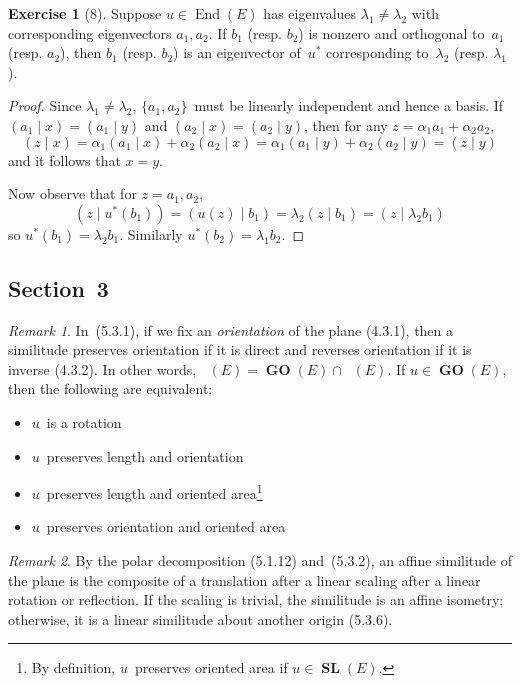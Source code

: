 \documentclass[letterpaper,12pt]{article}
\newcommand{\sect}{\cap}
\DeclareMathOperator{\End}{End}
\DeclareMathOperator{\GL}{\mathbf{GL}}
\DeclareMathOperator{\GLp}{\GL^+}
\DeclareMathOperator{\SL}{\mathbf{SL}}
\DeclareMathOperator{\GO}{\mathbf{GO}}
\DeclareMathOperator{\GOp}{\GO^+}
\newcommand{\innerprod}[2]{({#1}\;|\;{#2})}
\newcommand{\adj}[1]{#1^*}
\theoremstyle{definition}
\newtheorem*{exer}{Exercise}
\theoremstyle{remark}
\newtheorem*{rmk}{Remark}
\begin{document}
\begin{exer}[8]
Suppose \(u\in\End(E)\) has eigenvalues \(\lambda_1\ne\lambda_2\) with corresponding eigenvectors \(a_1,a_2\). If \(b_1\) (resp. \(b_2\)) is nonzero and orthogonal to~\(a_1\) (resp. \(a_2\)), then \(b_1\) (resp. \(b_2\)) is an eigenvector of~\(\adj{u}\) corresponding to~\(\lambda_2\) (resp. \(\lambda_1\)).
\end{exer}
\begin{proof}
Since \(\lambda_1\ne\lambda_2\), \(\{a_1,a_2\}\)~must be linearly independent and hence a basis. If \(\innerprod{a_1}{x}=\innerprod{a_1}{y}\) and \(\innerprod{a_2}{x}=\innerprod{a_2}{y}\), then for any \(z=\alpha_1a_1+\alpha_2a_2\),
\[\innerprod{z}{x}=\alpha_1\innerprod{a_1}{x}+\alpha_2\innerprod{a_2}{x}=\alpha_1\innerprod{a_1}{y}+\alpha_2\innerprod{a_2}{y}=\innerprod{z}{y}\]
and it follows that \(x=y\).

Now observe that for \(z=a_1,a_2\),
\[\innerprod{z}{\adj{u}(b_1)}=\innerprod{u(z)}{b_1}=\lambda_2\innerprod{z}{b_1}=\innerprod{z}{\lambda_2 b_1}\]
so \(\adj{u}(b_1)=\lambda_2b_1\). Similarly \(\adj{u}(b_2)=\lambda_1b_2\).
\end{proof}

\subsection*{Section~3}
\begin{rmk}
In~(5.3.1), if we fix an \emph{orientation} of the plane (4.3.1), then a similitude preserves orientation if it is direct and reverses orientation if it is inverse (4.3.2). In other words, \(\GOp(E)=\GO(E)\sect\GLp(E)\). If \(u\in\GO(E)\), then the following are equivalent:
\begin{itemize}[itemsep=0pt]
\item \(u\)~is a rotation
\item \(u\)~preserves length and orientation
\item \(u\)~preserves length and oriented area\footnote{By definition, \(u\)~preserves oriented area if \(u\in\SL(E)\).}
\item \(u\)~preserves orientation and oriented area
\end{itemize}
\end{rmk}

\begin{rmk}
By the polar decomposition (5.1.12) and~(5.3.2), an affine similitude of the plane is the composite of a translation after a linear scaling after a linear rotation or reflection. If the scaling is trivial, the similitude is an affine isometry; otherwise, it is a linear similitude about another origin (5.3.6).
\end{rmk}
\end{document}
